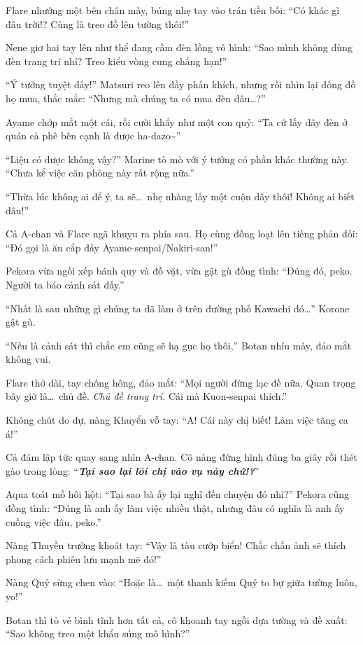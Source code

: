 \documentclass[../main.tex]{subfiles}
\begin{document}
Flare nhướng một bên chân mày, búng nhẹ tay vào trán tiền bối: ``Có khác gì đâu trời!? Cùng là treo đồ lên tường thôi!''

Nene giơ hai tay lên như thể đang cầm đèn lồng vô hình: ``Sao mình không dùng đèn trang trí nhỉ? Treo kiểu vòng cung chẳng hạn!''

``Ý tưởng tuyệt đấy!'' Matsuri reo lên đầy phấn khích, nhưng rồi nhìn lại đống đồ họ mua, thắc mắc: ``Nhưng mà chúng ta có mua đèn đâu\dots?''

Ayame chớp mắt một cái, rồi cười khẩy như một con quỷ: ``Ta cứ lấy dây đèn ở quán cà phê bên cạnh là được ha-dazo\~{}''

``Liệu có được không vậy?'' Marine tò mò với ý tưởng có phần khác thường này. ``Chưa kể việc căn phòng này rất rộng nữa.''

``Thừa lúc không ai để ý, ta sẽ\dots\ nhẹ nhàng lấy một cuộn dây thôi! Không ai biết đâu!''

Cả A-chan và Flare ngã khuỵu ra phía sau. Họ cùng đồng loạt lên tiếng phản đối: ``Đó gọi là ăn cắp đấy Ayame-senpai/Nakiri-san!''

Pekora vừa ngồi xếp bánh quy và đồ vặt, vừa gật gù đồng tình: ``Đúng đó, peko. Người ta báo cảnh sát đấy.''

``Nhất là sau những gì chúng ta đã làm ở trên đường phố Kawachi đó\dots'' Korone gật gù.

``Nếu là cảnh sát thì chắc em cũng sẽ hạ gục họ thôi,'' Botan nhíu mày, đảo mắt không vui.

Flare thở dài, tay chống hông, đảo mắt: ``Mọi người đừng lạc đề nữa. Quan trọng bây giờ là\dots\ chủ đề. \emph{Chủ đề trang trí.} Cái mà Kuon-senpai thích.''

Không chút do dự, nàng Khuyển vỗ tay: ``A! Cái này chị biết! Làm việc tăng ca á!''

Cả đám lập tức quay sang nhìn A-chan. Cô nàng đứng hình đúng ba giây rồi thét gào trong lòng: ``\textbf{\textit{Tại sao lại lôi chị vào vụ này chứ!?}}''

Aqua toát mồ hôi hột: ``Tại sao bà ấy lại nghĩ đến chuyện đó nhỉ?'' Pekora cũng đồng tình: ``Đúng là anh ấy làm việc nhiều thật, nhưng đâu có nghĩa là anh ấy cuồng việc đâu, peko.''

Nàng Thuyền trường khoát tay: ``Vậy là tàu cướp biển! Chắc chắn ảnh sẽ thích phong cách phiêu lưu mạnh mẽ đó!''

Nàng Quỷ sừng chen vào: ``Hoặc là\dots\ một thanh kiếm Quỷ to bự giữa tường luôn, yo!''

Botan thì tỏ vẻ bình tĩnh hơn tất cả, cô khoanh tay ngồi dựa tường và đề xuất: ``Sao không treo một khẩu súng mô hình?''
\end{document}
